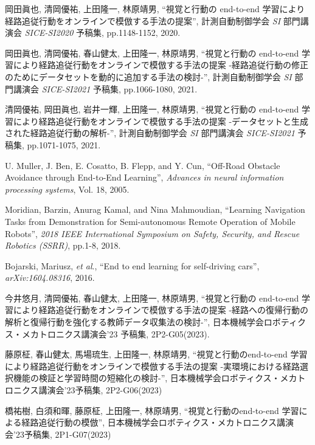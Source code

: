 \documentclass{jarticle}
\begin{document}
\footnotesize
\begin{thebibliography}{99}

岡田眞也, 清岡優祐, 上田隆一, 林原靖男, “視覚と行動の end-to-end 学習により経路追従行動をオンラインで模倣する手法の提案”, 計測自動制御学会 \textit{SI} 部門講演会 \textit{SICE-SI2020} 予稿集, pp.1148-1152, 2020.

岡田眞也, 清岡優祐, 春山健太, 上田隆一, 林原靖男, “視覚と行動の end-to-end 学習により経路追従行動をオンラインで模倣する手法の提案 -経路追従行動の修正のためにデータセットを動的に追加する手法の検討-”, 計測自動制御学会 \textit{SI} 部門講演会 \textit{SICE-SI2021} 予稿集, pp.1066-1080, 2021.

清岡優祐, 岡田眞也, 岩井一輝, 上田隆一, 林原靖男, “視覚と行動の end-to-end 学習により経路追従行動をオンラインで模倣する手法の提案 -データセットと生成された経路追従行動の解析-”, 計測自動制御学会 \textit{SI} 部門講演会 \textit{SICE-SI2021} 予稿集, pp.1071-1075, 2021.

U. Muller, J. Ben, E. Cosatto, B. Flepp, and Y. Cun, “Off-Road Obstacle Avoidance through End-to-End Learning”, \textit{Advances in neural information processing systems}, Vol. 18, 2005.

Moridian, Barzin, Anurag Kamal, and Nina Mahmoudian, “Learning Navigation Tasks from Demonstration for Semi-autonomous Remote Operation of Mobile Robots”, \textit{2018 IEEE International Symposium on Safety, Security, and Rescue Robotics (SSRR)}, pp.1-8, 2018.

Bojarski, Mariusz, \textit{et al}., “End to end learning for self-driving cars”, \textit{arXiv:1604.08316}, 2016.

今井悠月, 清岡優祐, 春山健太, 上田隆一, 林原靖男, “視覚と行動の end-to-end 学習により経路追従行動をオンラインで模倣する手法の提案 -経路への復帰行動の解析と復帰行動を強化する教師データ収集法の検討-”, 日本機械学会ロボティクス・メカトロニクス講演会'23 予稿集, 2P2-G05(2023).

藤原柾, 春山健太, 馬場琉生, 上田隆一, 林原靖男, “視覚と行動のend-to-end 学習により経路追従行動をオンラインで模倣する手法の提案 -実環境における経路選択機能の検証と学習時間の短縮化の検討-”, 日本機械学会ロボティクス・メカトロニクス講演会'23予稿集, 2P2-G06(2023)

橋祐樹, 白須和暉, 藤原柾, 上田隆一, 林原靖男, “視覚と行動のend-to-end 学習による経路追従行動の模倣”, 日本機械学会ロボティクス・メカトロニクス講演会'23予稿集, 2P1-G07(2023)


\end{thebibliography}
\end{document}
